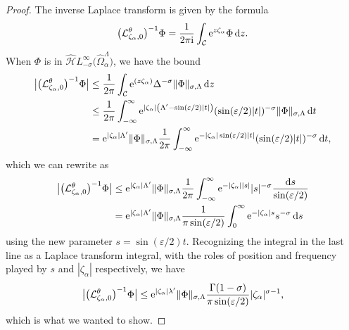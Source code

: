 \documentclass[pdftex]{sigma}
\let\Re\relax
\DeclareMathOperator{\Re}{Re}
\newcommand{\dualsingexp}[1]{\widehat{\mathcal{H}}L^\infty_{#1}}
\newcommand{\laplace}{\mathcal{L}}
\numberwithin{equation}{section}
\begin{document}
\begin{proof}
The inverse Laplace transform is given by the formula
\[ \bigl(\laplace_{\zeta_\alpha, 0}^\theta\bigr)^{-1} \Phi = \frac{1}{2 \pi {\rm i}} \int_{\mathcal{C}} {\rm e}^{z\zeta_\alpha} \Phi\,{\rm d}z. \]
When $\Phi$ is in $\dualsingexp{-\sigma}\bigl(\widehat{\Omega}_\alpha^\Lambda\bigr)$, we have the bound
\begin{align*}
\big|\bigl(\laplace_{\zeta_\alpha, 0}^\theta\bigr)^{-1} \Phi\big| & \le \frac{1}{2 \pi} \int_{\mathcal{C}} {\rm e}^{\Re(z\zeta_\alpha)} \Delta^{-\sigma} \|\Phi\|_{\sigma, \Lambda}\,{\rm d}z \\
& \le \frac{1}{2 \pi} \int_{-\infty}^\infty {\rm e}^{|\zeta_\alpha| \left(\Lambda' - \sin(\varepsilon/2) |t|\right)} (\sin(\varepsilon/2) |t|)^{-\sigma} \|\Phi\|_{\sigma, \Lambda} \,{\rm d}t \\
& = {\rm e}^{|\zeta_\alpha| \Lambda'} \|\Phi\|_{\sigma, \Lambda} \frac{1}{2 \pi} \int_{-\infty}^\infty {\rm e}^{-|\zeta_\alpha| \sin(\varepsilon/2) |t|} (\sin(\varepsilon/2) |t|)^{-\sigma}\, {\rm d}t,
\end{align*}
which we can rewrite as
\begin{align*}
\big|\bigl(\laplace_{\zeta_\alpha, 0}^\theta\bigr)^{-1} \Phi\big| & \le {\rm e}^{|\zeta_\alpha| \Lambda'} \|\Phi\|_{\sigma, \Lambda} \frac{1}{2 \pi} \int_{-\infty}^\infty {\rm e}^{-|\zeta_\alpha| |s|} |s|^{-\sigma} \frac{{\rm d}s}{\sin(\varepsilon/2)} \\
& = {\rm e}^{|\zeta_\alpha| \Lambda'} \|\Phi\|_{\sigma, \Lambda} \frac{1}{\pi \sin(\varepsilon/2)} \int_0^\infty {\rm e}^{-|\zeta_\alpha|s} s^{-\sigma}\,{\rm d}s
\end{align*}
using the new parameter $s = \sin(\varepsilon/2) t$. Recognizing the integral in the last line as a Laplace transform integral, with the roles of position and frequency played by $s$ and $|\zeta_\alpha|$ respectively, we have
\[ \big|\bigl(\laplace_{\zeta_\alpha, 0}^\theta\bigr)^{-1} \Phi\big| \le {\rm e}^{|\zeta_\alpha| \lambda'} \|\Phi\|_{\sigma, \Lambda} \frac{\Gamma(1-\sigma)}{\pi \sin(\varepsilon/2)} |\zeta_\alpha|^{\sigma-1}, \]
which is what we wanted to show.
\end{proof}
\end{document}
